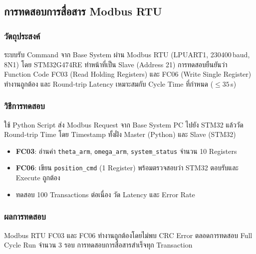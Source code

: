 \subsection{การทดสอบการสื่อสาร Modbus RTU}
\label{subsec:modbus_test}

\subsubsection{วัตถุประสงค์}

ระบบรับ Command จาก Base System ผ่าน Modbus RTU (LPUART1, 230400\,baud, 8N1)
โดย STM32G474RE ทำหน้าที่เป็น Slave (Address 21)
การทดสอบยืนยันว่า Function Code FC03 (Read Holding Registers)
และ FC06 (Write Single Register) ทำงานถูกต้อง
และ Round-trip Latency เหมาะสมกับ Cycle Time ที่กำหนด ($\leq 35$\,s)

\subsubsection{วิธีการทดสอบ}

ใช้ Python Script ส่ง Modbus Request จาก Base System PC ไปยัง STM32
แล้ววัด Round-trip Time โดย Timestamp ทั้งฝั่ง Master (Python) และ Slave (STM32)
\begin{itemize}
    \item \textbf{FC03}: อ่านค่า \texttt{theta\_arm}, \texttt{omega\_arm}, \texttt{system\_status}
          จำนวน 10 Registers
    \item \textbf{FC06}: เขียน \texttt{position\_cmd} (1 Register) พร้อมตรวจสอบว่า
          STM32 ตอบรับและ Execute ถูกต้อง
    \item ทดสอบ 100 Transactions ต่อเนื่อง วัด Latency และ Error Rate
\end{itemize}

\subsubsection{ผลการทดสอบ}

\noindent Modbus RTU FC03 และ FC06 ทำงานถูกต้องโดยไม่พบ CRC Error
ตลอดการทดสอบ Full Cycle Run จำนวน 3 รอบ การทดสอบการสื่อสารสำเร็จทุก Transaction

